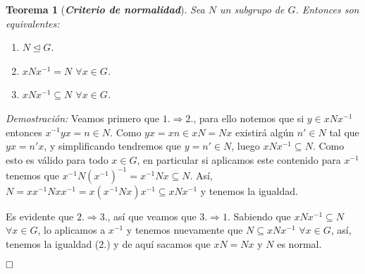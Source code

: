 \documentclass[12pt]{article}
\newtheorem{theorem}{Teorema}[section]
\begin{document}
\begin{theorem}[\textbf{\textit{Criterio de normalidad}}]
Sea $N$ un subgrupo de $G$. Entonces son equivalentes:
\begin{enumerate}
\item $N\unlhd G$.
\item $xN x^{-1} = N$ $\forall x \in G$.
\item $xNx^{-1} \subseteq N$ $\forall x \in G$.
\end{enumerate}
\end{theorem}
\emph{Demostración: }Veamos primero que $1.\Rightarrow 2.$, para ello notemos que si $y\in xNx^{-1}$ entonces $x^{-1}yx = n \in N$. Como $yx = xn \in xN = Nx$ existirá algún $n' \in N$ tal que $yx = n'x$, y simplificando tendremos que $y = n' \in N$, luego $xNx^{-1} \subseteq N$. Como esto es válido para todo $x \in G$, en particular si aplicamos este contenido para $x^{-1}$ tenemos que $x^{-1}N(x^{-1})^{-1}= x^{-1}Nx \subseteq N$. Así, $N = xx^{-1}Nxx^{-1} = x(x^{-1}Nx)x^{-1} \subseteq xNx^{-1}$ y tenemos la igualdad. 

Es evidente que $2.\Rightarrow 3.$, así que veamos que $3.\Rightarrow 1.$ Sabiendo que $xNx^{-1} \subseteq N$ $\forall x\in G$, lo aplicamos a $x^{-1}$ y tenemos nuevamente que $N \subseteq xNx^{-1}$ $\forall x \in G$, así, tenemos la igualdad ($2.$) y de aquí sacamos que $xN = Nx$ y $N$ es normal.

$\hfill \square$
\end{document}

